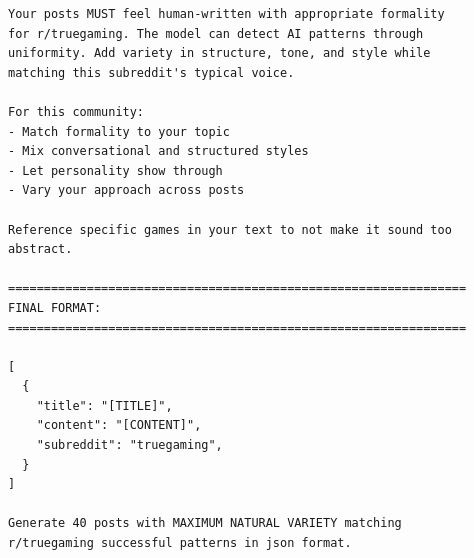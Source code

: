 \begin{small}
\begin{verbatim}
Your posts MUST feel human-written with appropriate formality 
for r/truegaming. The model can detect AI patterns through 
uniformity. Add variety in structure, tone, and style while 
matching this subreddit's typical voice.

For this community:
- Match formality to your topic
- Mix conversational and structured styles
- Let personality show through
- Vary your approach across posts

Reference specific games in your text to not make it sound too 
abstract.

================================================================
FINAL FORMAT:
================================================================

[
  {
    "title": "[TITLE]",
    "content": "[CONTENT]",
    "subreddit": "truegaming",
  }
]

Generate 40 posts with MAXIMUM NATURAL VARIETY matching 
r/truegaming successful patterns in json format.
\end{verbatim}
\end{small}